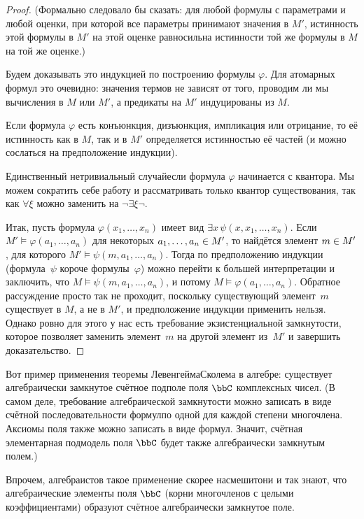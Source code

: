 \begin{proof}
(Формально следовало бы сказать: для любой формулы с параметрами
и любой оценки, при которой все параметры принимают значения в
$M'$, истинность этой формулы в $M'$ на этой оценке равносильна
истинности той же формулы в $M$ на той же оценке.)

Будем доказывать это индукцией по построению формулы $\varphi$.
Для атомарных формул это очевидно: значения термов не
зависят от того, проводим ли мы вычисления в $M$ или $M'$, а
предикаты на $M'$ индуцированы из $M$.

Если формула $\varphi$ есть конъюнкция, дизъюнкция, импликация
или отрицание, то её истинность как в $M$, так и в $M'$ определяется
истинностью её частей (и можно сослаться на предположение индукции).

Единственный нетривиальный случай\т если формула $\varphi$
начинается с квантора. Мы можем сократить себе работу и
рассматривать только квантор существования, так как $\forall\xi$
можно заменить на $\lnot\exists\xi\lnot$. 

Итак, пусть формула
$\varphi(x_1,\dots,x_n)$ имеет вид
        $
\exists x\, \psi (x, x_1,\dots,x_n).
        $
Если $M'\vDash \varphi(a_1,\dots,a_n)$ для некоторых
$a_1,\dots,a_n\hm\in M'$, то найдётся
элемент $m\hm\in M'$, для которого
$M'\vDash\psi(m,a_1,\dots,a_n)$. Тогда по предположению индукции
(формула~$\psi$ короче формулы~$\varphi$) можно перейти к
большей интерпретации и заключить, что
$M\vDash\psi(m,a_1,\dots,a_n)$, и потому $M\vDash \varphi(a_1,\dots,a_n)$. Обратное
рассуждение просто так не проходит, поскольку существующий
элемент~$m$ существует в $M$, а не в $M'$, и предположение
индукции применить нельзя. Однако ровно для этого у нас есть
требование экзистенциальной замкнутости, которое позволяет
заменить элемент~$m$ на другой элемент из~$M'$ и завершить
доказательство.
\end{proof}

Вот пример применения теоремы Левенгейма\ч Сколема в алгебре:
существует алгебраически замкнутое счётное подполе поля $\bbC$
комплексных чисел. (В самом деле, требование алгебраической замкнутости
можно записать в виде счётной последовательности формул\т по одной
для каждой степени многочлена. Аксиомы поля также можно записать
в виде формул. Значит, счётная элементарная подмодель
поля $\bbC$ будет также алгебраически замкнутым полем.)

Впрочем, алгебраистов такое применение скорее насмешит\т они и
так знают, что алгебраические элементы поля $\bbC$ (корни
многочленов с целыми коэффициентами) образуют счётное
алгебраически замкнутое поле.

